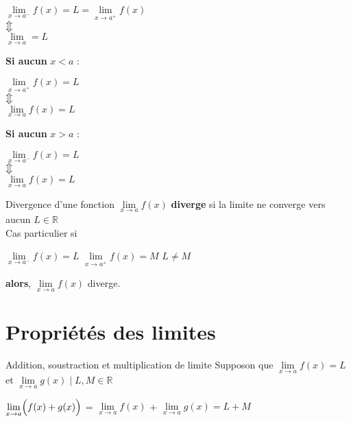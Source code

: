 \documentclass[2pt]{report}
\begin{document}
\begin{multicols*}{3}
\begin{Definitionx*}{}{}
  \begin{center}
    $\lim\limits_{x\to a^{-}}f(x) = L = \lim\limits_{x\to a^{+}}f(x) $\\ 
    $\big\Updownarrow$ \\
    $\lim\limits_{x\to a} = L$
  \end{center}

  \textbf{Si aucun} $x < a$ :  
  
  \begin{center}
    $\lim\limits_{x\to a^{+}}f(x) = L $ \\ 
    $\big\Updownarrow$ \\
    $\lim\limits_{x\to a}f(x) = L $
  \end{center}

  \textbf{Si aucun} $x > a$ :  
  
  \begin{center}
    $\lim\limits_{x\to a^{-}}f(x) = L $ \\ 
    $\big\Updownarrow$ \\
    $\lim\limits_{x\to a}f(x) = L $
  \end{center}

\end{Definitionx*}

\begin{Definitionx*}{Divergence d'une fonction}{}
  $\lim\limits_{x\to a}f(x) $ \textbf{diverge}   si la limite ne converge vers aucun $L \in \mathbb{R}$
  \\
  \textcolor{myb}{Cas particulier} si 
  {\begin{enumerate}
       $\lim\limits_{x\to a^{-}}f(x) = L $
       $\lim\limits_{x\to a^{+}}f(x) = M $ 
       $ L \neq M$ 
  \end{enumerate}}
  \begin{center}
  \textbf{alors}, $\lim\limits_{x\to a}f(x) $ \textcolor{myb}{diverge}. 
  \end{center}
\end{Definitionx*}


\section{Propriétés des limites}
\begin{Concept}{Addition, soustraction et multiplication de limite}{}
  Supposon que $\lim\limits_{x\to a}f(x) = L $ et $\lim\limits_{x\to a}g(x) \; | \; L, M \in \mathbb{R} $
  \begin{enumerate}
     $\lim\limits_{x\to a}\Bigl(f(x) + g(x) \Bigr) $ 
    =  $\lim\limits_{x\to a}f(x)$ +  $\lim\limits_{x\to a}g(x) = L + M$


\end{enumerate}
\end{Concept}
\end{multicols*}
\end{document}
